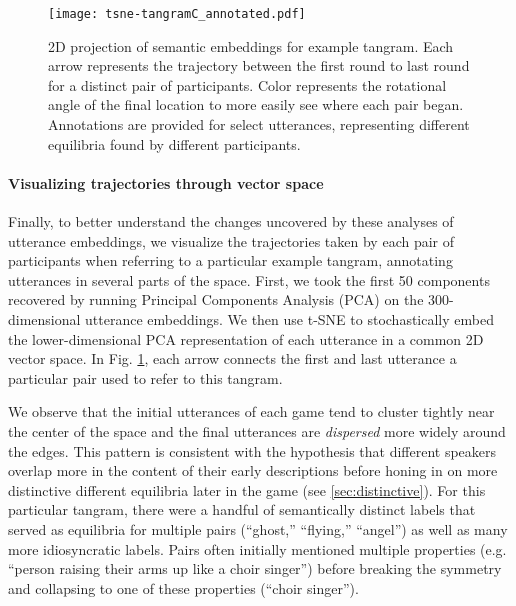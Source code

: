 \begin{figure}[t!]
\centering
\texttt{[image: tsne-tangramC\_annotated.pdf]}
\caption{2D projection of semantic embeddings for example tangram. Each arrow represents the trajectory between the first round to last round for a distinct pair of participants. Color represents the rotational angle of the final location to more easily see where each pair began. Annotations are provided for select utterances, representing different equilibria found by different participants.}
\label{fig:tsne}
\end{figure}


\paragraph{Visualizing trajectories through vector space}  
Finally, to better understand the changes uncovered by these analyses of utterance embeddings, we visualize the trajectories taken by each pair of participants when referring to a particular example tangram, annotating utterances in several parts of the space.
First, we took the first 50 components recovered by running Principal Components Analysis (PCA) on the 300-dimensional utterance embeddings. 
We then use t-SNE \cite{maaten2008visualizing} to stochastically embed the lower-dimensional PCA representation of each utterance in a common 2D vector space. 
In Fig. \ref{fig:tsne}, each arrow connects the first and last utterance a particular pair used to refer to this tangram.

We observe that the initial utterances of each game tend to cluster tightly near the center of the space and the final utterances are \emph{dispersed} more widely around the edges. 
This pattern is consistent with the hypothesis that different speakers overlap more in the content of their early descriptions before honing in on more distinctive different equilibria later in the game  (see \ref{sec:distinctive}). 
For this particular tangram, there were a handful of semantically distinct labels that served as equilibria for multiple pairs (``ghost,'' ``flying,'' ``angel'') as well as many more idiosyncratic labels.
Pairs often initially mentioned multiple properties (e.g. ``person raising their arms up like a choir singer'') before breaking the symmetry and collapsing to one of these properties (``choir singer'').



